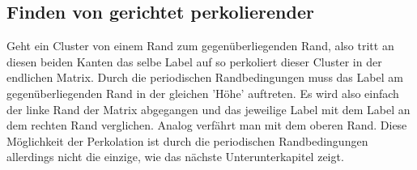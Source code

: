 \documentclass[a4paper, 12pt]{report}
\begin{document}
\clearpage
\subsection{Finden von gerichtet perkolierender \label{gerichtet}}
Geht ein Cluster von einem Rand zum gegenüberliegenden Rand, also tritt an diesen beiden Kanten das selbe Label auf so perkoliert dieser Cluster in der endlichen Matrix. Durch die periodischen Randbedingungen muss das Label am gegenüberliegenden Rand in der gleichen 'Höhe' auftreten. Es wird also einfach der linke Rand der Matrix abgegangen und das jeweilige Label mit dem Label an dem rechten Rand verglichen. Analog verfährt man mit dem oberen Rand. Diese Möglichkeit der Perkolation ist durch die periodischen Randbedingungen allerdings nicht die einzige, wie das nächste Unterunterkapitel zeigt.
\end{document}
